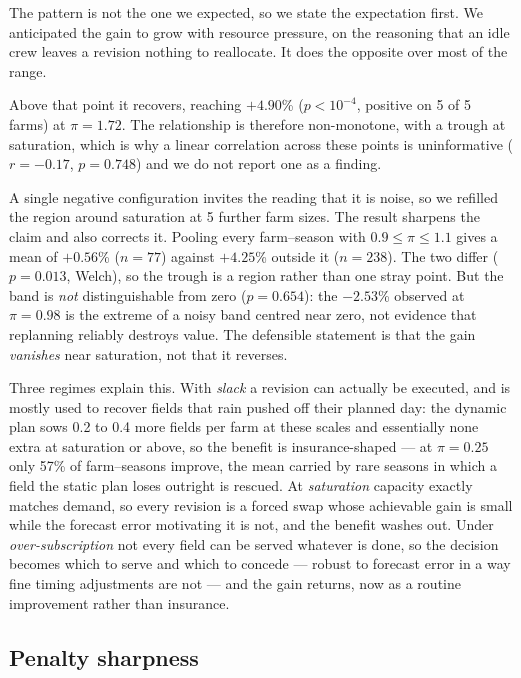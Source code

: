 \documentclass[10pt,twocolumn]{article}
\begin{document}
The pattern is not the one we expected, so we state the expectation
first. We anticipated the gain to grow with resource pressure, on
the reasoning that an idle crew leaves a revision nothing to
reallocate. It does the opposite over most of the range.

Above that point it recovers, reaching $+4.90$\%
($p < 10^{-4}$, positive on 5 of 5 farms) at $\pi = 1.72$. The relationship is therefore
non-monotone, with a trough at saturation, which is why a linear
correlation across these points is uninformative ($r = -0.17$,
$p = 0.748$) and we do not report one as a finding.

A single negative configuration invites the reading that it is
noise, so we refilled the region around saturation at
5 further farm sizes. The result
sharpens the claim and also corrects it. Pooling every
farm--season with $0.9 \le \pi \le 1.1$ gives a mean of $+0.56$\% ($n = 77$) against
$+4.25$\% outside it ($n = 238$). The two differ
($p = 0.013$, Welch), so the trough is a
region rather than one stray point. But the band is
\emph{not} distinguishable from zero
($p = 0.654$): the
$-2.53$\% observed at
$\pi = 0.98$ is the
extreme of a noisy band centred near zero, not evidence that
replanning reliably destroys value. The defensible statement is
that the gain \emph{vanishes} near saturation, not that it
reverses.

Three regimes explain this. With \emph{slack} a revision can
actually be executed, and is mostly used to recover fields that rain
pushed off their planned day: the dynamic plan sows 0.2 to 0.4 more
fields per farm at these scales and essentially none extra at
saturation or above, so the benefit is insurance-shaped --- at
$\pi = 0.25$ only 57\%
of farm--seasons improve, the mean carried by rare seasons in which
a field the static plan loses outright is rescued. At
\emph{saturation} capacity exactly matches demand, so every
revision is a forced swap whose achievable gain is small while the
forecast error motivating it is not, and the benefit washes out.
Under \emph{over-subscription} not every field can be served
whatever is done, so the decision becomes which to serve and which
to concede --- robust to forecast error in a way fine timing
adjustments are not --- and the gain returns, now as a routine
improvement rather than insurance.

\subsection{Penalty sharpness}
\end{document}
